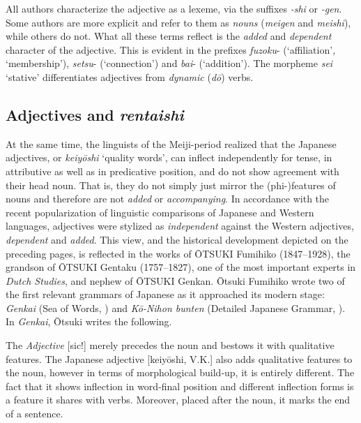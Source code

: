 \documentclass[output=paper,colorlinks,citecolor=brown]{langscibook}
\begin{document}
All authors characterize the adjective as a lexeme, via the suffixes \emph{-shi} or \emph{-gen}. Some authors are more explicit and refer to them as \emph{nouns} (\emph{meigen} and \emph{meishi}), while others do not. What all these terms reflect is the \emph{added} and \emph{dependent} character of the adjective. This is evident in the prefixes \emph{fuzoku}- (`affiliation'\emph{,} `membership'), \emph{setsu}- (`connection') and \emph{bai}- (`addition'). The morpheme \emph{sei} `stative' differentiates adjectives from \emph{dynamic} (\emph{dō}) verbs.

\subsection{Adjectives and	\emph{rentaishi}} \label{12sec4.3}

At the same time, the linguists of the Meiji-period realized that the Japanese adjectives, or \emph{keiyōshi} `quality words', can inflect independently for tense, in attributive as well as in predicative position, and do not show agreement with their head noun. That is, they do not simply just mirror the (phi-)features of nouns and therefore are not \emph{added} or \emph{accompanying}. In accordance with the recent popularization of linguistic comparisons of Japanese and Western languages, adjectives were stylized as \emph{independent} against the Western adjectives, \emph{dependent} and \emph{added}. This view, and the historical development depicted on the preceding pages, is reflected in the works of ŌTSUKI Fumihiko (1847--1928), the grandson of ŌTSUKI Gentaku (1757--1827), one of the most important experts in \emph{Dutch Studies}, and nephew of ŌTSUKI Genkan. Ōtsuki Fumihiko wrote two of the first relevant grammars of Japanese as it approached its modern stage: \emph{Genkai} (Sea of Words, \citeyear{otsuki1891}) and \emph{Kō-Nihon bunten} (Detailed Japanese Grammar, \citeyear{otsuki1897}). In \emph{Genkai}, Ōtsuki writes the following.

\largerpage[-0.5]

\begin{exe}
	\ex \label{12ex36}
	The  \emph{Adjective} [sic!] merely precedes the noun and bestows it with qualitative features. The Japanese adjective [keiyōshi, V.K.] also adds qualitative features to the noun, however in terms of morphological build-up, it is entirely different. The fact that it shows inflection in word-final position and different inflection forms is a feature it shares with verbs. Moreover, placed after the noun, it marks the end of a sentence.
	
	\hfill \citep[28]{otsuki1891}
\end{exe}
\end{document}
